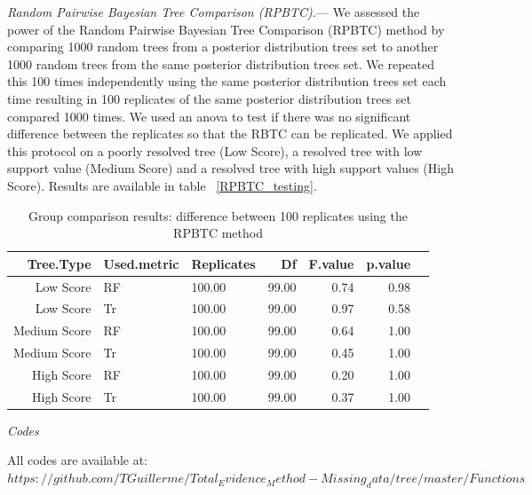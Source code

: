 \documentclass[12pt,letterpaper]{article}
\renewcommand{\subsection}[1]{%
\bigskip
\begin{center}
\begin{large}
\normalfont\itshape #1
\end{large}
\end{center}}
\renewcommand{\subsubsection}[1]{%
\vspace{2ex}
\noindent
\textit{#1.}---}
\begin{document}
\subsubsection{Random Pairwise Bayesian Tree Comparison (RPBTC)}
We assessed the power of the Random Pairwise Bayesian Tree Comparison (RPBTC) method by comparing 1000 random trees from a posterior distribution trees set to another 1000 random trees from the same posterior distribution trees set.
We repeated this 100 times independently using the same posterior distribution trees set each time resulting in 100 replicates of the same posterior distribution trees set compared 1000 times.
We used an anova to test if there was no significant difference between the replicates so that the RBTC can be replicated.
We applied this protocol on a poorly resolved tree (Low Score), a resolved tree with low support value (Medium Score) and a resolved tree with high support values (High Score).
Results are available in table ~\ref{RPBTC_testing}. %

\begin{table}[ht]
\caption{Group comparison results: difference between 100 replicates using the RPBTC method} %
\centering
\begin{tabular}{rllrrrr}
  \hline
  Tree.Type & Used.metric & Replicates & Df & F.value & p.value \\ 
  \hline
  Low Score & RF & 100.00 & 99.00 & 0.74 & 0.98 \\ 
  Low Score & Tr & 100.00 & 99.00 & 0.97 & 0.58 \\ 
  Medium Score & RF & 100.00 & 99.00 & 0.64 & 1.00 \\ 
  Medium Score & Tr & 100.00 & 99.00 & 0.45 & 1.00 \\ 
  High Score & RF & 100.00 & 99.00 & 0.20 & 1.00 \\ 
  High Score & Tr & 100.00 & 99.00 & 0.37 & 1.00 \\ 
  \hline
\end{tabular}
\end{table}
\label{RPBTC_testing}

\subsection{Codes}
All codes are available at: $https://github.com/TGuillerme/Total_Evidence_Method-Missing_data/tree/master/Functions$

\end{document}
